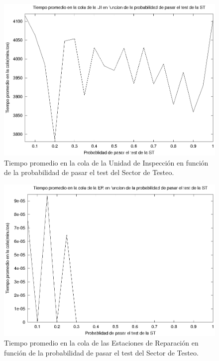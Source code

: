 \documentclass[a4paper,10pt]{article}
\begin{document}
\begin{figure}[ht]
\begin{center}
\includegraphics[width=15cm]{./img/tp_UI.eps}
\caption{\label{fig:tp_UI} Tiempo promedio en la cola de la Unidad de Inspecci\'on en funci\'on de la probabilidad de pasar el test del Sector de Testeo.}
\end{center}
\end{figure}

\begin{figure}[ht]
\begin{center}
\includegraphics[width=15cm]{./img/tp_ER.eps}
\caption{\label{fig:tp_ER} Tiempo promedio en la cola de las Estaciones de Reparaci\'on en funci\'on de la probabilidad de pasar el test del Sector de Testeo.}
\end{center}
\end{figure}
\end{document}
